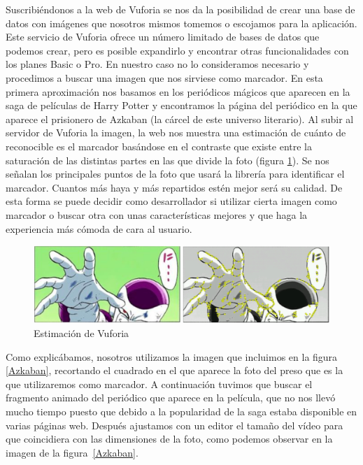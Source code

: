 Suscribiéndonos a la web de Vuforia se nos da la posibilidad de crear una base de datos con imágenes que nosotros mismos tomemos o escojamos para la aplicación. Este servicio de Vuforia ofrece un número limitado de bases de datos que podemos crear, pero es posible expandirlo y encontrar otras funcionalidades con los planes Basic o Pro. En nuestro caso no lo consideramos necesario y procedimos a buscar una imagen que nos sirviese como marcador. En esta primera aproximación nos basamos en los periódicos mágicos que aparecen en la saga de películas de Harry Potter y encontramos la página del periódico en la que aparece el prisionero de Azkaban (la cárcel de este universo literario). Al subir al servidor de Vuforia la imagen, la web nos muestra una estimación de cuánto de reconocible es el marcador basándose en el contraste que existe entre la saturación de las distintas partes en las que divide la foto (figura \ref{VufEst}). Se nos señalan los principales puntos de la foto que usará la librería para identificar el marcador. Cuantos más haya y más repartidos estén mejor será su calidad. De esta forma se puede decidir como desarrollador si utilizar cierta imagen como marcador o buscar otra con unas características mejores y que haga la experiencia más cómoda de cara al usuario.\\

\begin{figure}[H]
    \centering
    \includegraphics[width=0.9\linewidth]{Images/vuforiaMarks.jpg}
    \caption{Estimación de Vuforia}
    \label{VufEst}
\end{figure}

Como explicábamos, nosotros utilizamos la imagen que incluimos en la figura \ref{Azkaban}, recortando el cuadrado en el que aparece la foto del preso que es la que utilizaremos como marcador. A continuación tuvimos que buscar el fragmento animado del periódico que aparece en la película, que no nos llevó mucho tiempo puesto que debido a la popularidad de la saga estaba disponible en varias páginas web. Después ajustamos con un editor el tamaño del vídeo para que coincidiera con las dimensiones de la foto, como podemos observar en la imagen de la figura~\ref{Azkaban}.\\


